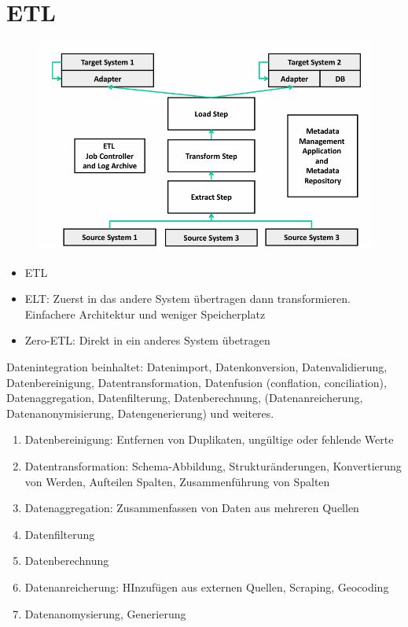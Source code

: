 \documentclass[../Main.tex]{subfiles}
\begin{document}
\section{ETL}

\begin{figure}[H]
    \centering
    \includegraphics[width=1\linewidth]{Images/datan/etl-prozess.png}
\end{figure}

\begin{itemize}
    \item ETL
    \item ELT: Zuerst in das andere System übertragen dann transformieren. Einfachere Architektur und weniger Speicherplatz
    \item Zero-ETL: Direkt in ein anderes System übetragen
\end{itemize}

Datenintegration beinhaltet: Datenimport, Datenkonversion, Datenvalidierung, Datenbereinigung,
Datentransformation, Datenfusion (conflation, conciliation), Datenaggregation, Datenfilterung,
Datenberechnung, (Datenanreicherung, Datenanonymisierung, Datengenerierung) und weiteres.

\begin{enumerate}
    \item Datenbereinigung: Entfernen von Duplikaten, ungültige oder fehlende Werte
    \item Datentransformation: Schema-Abbildung, Strukturänderungen, Konvertierung von Werden, Aufteilen Spalten, Zusammenführung von Spalten
    \item Datenaggregation: Zusammenfassen von Daten aus mehreren Quellen
    \item Datenfilterung
    \item Datenberechnung
    \item Datenanreicherung: HInzufügen aus externen Quellen, Scraping, Geocoding
    \item Datenanomysierung, Generierung
\end{enumerate}
\end{document}
